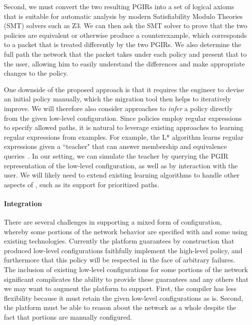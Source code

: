Second, we must convert the two resulting PGIRs into a set of logical axioms that is suitable for automatic analysis by modern Satisfiability Modulo Theories (SMT) solvers such as Z3.  We can then ask the SMT solver to prove that the two policies are equivalent or otherwise produce a counterexample, which corresponds to a packet that is treated differently by the two PGIRs.  We also determine the full path the network that the packet takes under each policy and present that to the user, allowing him to easily understand the differences and make appropriate changes to the \Name policy.

One downside of the proposed approach is that it requires the engineer to devise an initial \Name policy manually, which the migration tool then helps to iteratively improve.  We will therefore also consider approaches to {\em infer} a \Name policy directly from the given low-level configuration.  Since \Name policies employ regular expressions to specify allowed paths, it is natural to leverage existing approaches to learning regular expressions from examples.  For example, the L* algorithm learns regular expressions given a ``teacher" that can answer membership and equivalence queries~\cite{}.  In our setting, we can simulate the teacher by querying the PGIR representation of the low-level configuration, as well as by interaction with the user.  We will likely need to extend existing learning algorithms to handle other aspects of \Name, such as its support for prioritized paths.

\paragraph{Integration} There are several challenges in supporting a mixed form of configuration, whereby some portions of the network behavior are specified with \Name and some using existing technologies.  Currently the \Name platform guarantees by construction that produced low-level configurations faithfully implement the high-level policy, and furthermore that this policy will be respected in the face of arbitrary failures.  The inclusion of existing low-level configurations for some portions of the network significant complicates the ability to provide these guarantees and any others that we may want to augment the platform to support. First, the \Name compiler has less flexibility because it must retain the given low-level configurations as is.  Second, the \Name platform must be able to reason about the network as a whole despite the fact that portions are manually configured.

